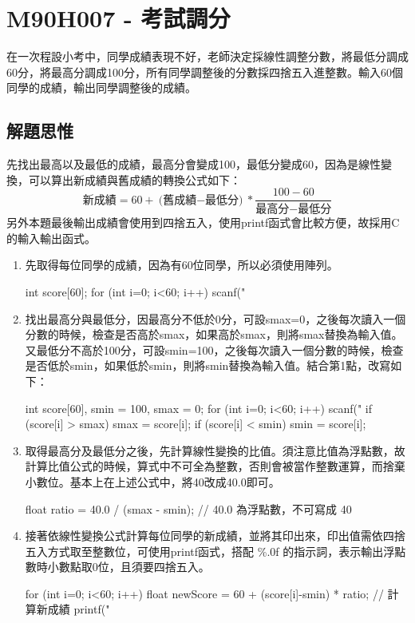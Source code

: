 \section{M90H007 - 考試調分}
在一次程設小考中，同學成績表現不好，老師決定採線性調整分數，將最低分調成60分，將最高分調成100分，所有同學調整後的分數採四捨五入進整數。輸入60個同學的成績，輸出同學調整後的成績。
\subsection{解題思惟}
先找出最高以及最低的成績，最高分會變成100，最低分變成60，因為是線性變換，可以算出新成績與舊成績的轉換公式如下：
$$
\mbox{新成績} = 60 + \mbox{(舊成績$-$最低分)}*{\frac{100-60}{\mbox{最高分$-$最低分}}}
$$
另外本題最後輸出成績會使用到四捨五入，使用printf函式會比較方便，故採用C的輸入輸出函式。
\begin{enumerate}
\item 先取得每位同學的成績，因為有60位同學，所以必須使用陣列。
\begin{inside}
	int score[60]; 
	for (int i=0; i<60; i++) scanf("%
\end{inside}
\item 找出最高分與最低分，因最高分不低於0分，可設smax=0，之後每次讀入一個分數的時候，檢查是否高於smax，如果高於smax，則將smax替換為輸入值。又最低分不高於100分，可設smin=100，之後每次讀入一個分數的時候，檢查是否低於smin，如果低於smin，則將smin替換為輸入值。結合第1點，改寫如下：
	\begin{inside}
	int score[60], smin = 100, smax = 0;
	for (int i=0; i<60; i++) {
		scanf("%
		if (score[i] > smax) smax = score[i];
		if (score[i] < smin) smin = score[i];
	}
	\end{inside}
\item 取得最高分及最低分之後，先計算線性變換的比值。須注意比值為浮點數，故計算比值公式的時候，算式中不可全為整數，否則會被當作整數運算，而捨棄小數位。基本上在上述公式中，將40改成40.0即可。
	\begin{inside}
	float ratio = 40.0 / (smax - smin); // 40.0 為浮點數，不可寫成 40
	\end{inside}
\item 接著依線性變換公式計算每位同學的新成績，並將其印出來，印出值需依四捨五入方式取至整數位，可使用printf函式，搭配 \%.0f 的指示詞，表示輸出浮點數時小數點取0位，且須要四捨五入。
	\begin{inside}
	for (int i=0; i<60; i++) {
		float newScore = 60 + (score[i]-smin) * ratio; // 計算新成績
		printf("%
	}
	\end{inside}
\end{enumerate}

